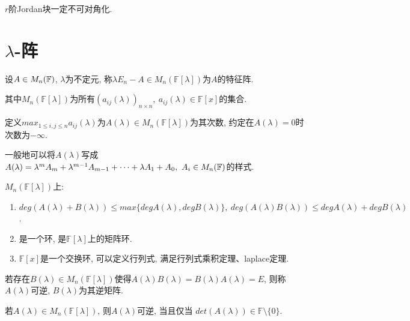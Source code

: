 \begin{example}
    $r$阶Jordan块一定不可对角化.
\end{example}

\section{ $\lambda$-阵 }

\begin{definition}[特征阵]
    设$A\in M_{n}(\mathbb{F})$, $\lambda$为不定元, 称$\lambda E_n-A\in M_n(\mathbb{F}[\lambda])$为$A$的特征阵.\par
    其中$M_n(\mathbb{F}[\lambda])$为所有$(a_{ij}(\lambda))_{n\times n},\ a_{ij}(\lambda)\in \mathbb{F}[x]$的集合.
\end{definition}


\begin{definition}
    定义$max_{1\le i,j \le n}a_{ij}(\lambda)$为$A(\lambda)\in M_n(\mathbb{F}[\lambda])$为其次数, 约定在$A(\lambda)=0$时次数为$-\infty$.\par
    一般地可以将$A(\lambda)$写成$A(\lambda)=\lambda{^m}A_m+\lambda{^{m-1}}A_{m-1}+\cdots+\lambda A_1+A_0,\ A_i\in M_{n}(\mathbb{F})$的样式.
\end{definition}

\begin{property}
    $M_n(\mathbb{F}[\lambda])$上:\par
    \begin{enumerate}[itemindent=1em]
        \item $deg(A(\lambda)+B(\lambda))\le max\{degA(\lambda), degB(\lambda)\},\ deg(A(\lambda)B(\lambda))\le degA(\lambda)+degB(\lambda)$.
        \item 是一个环, 是$\mathbb{F}[\lambda]$上的矩阵环.
        \item $\mathbb{F}[x]$是一个交换环, 可以定义行列式, 满足行列式乘积定理、laplace定理.
    \end{enumerate}
\end{property}

\begin{definition}
    若存在$B(\lambda)\in M_n(\mathbb{F}[\lambda])$使得$A(\lambda)B(\lambda)=B(\lambda)A(\lambda)=E$, 则称$A(\lambda)$可逆, $B(\lambda)$为其逆矩阵.
\end{definition}

\begin{theorem}
    若$A(\lambda)\in M_n(\mathbb{F}[\lambda])$, 则$A(\lambda)$可逆, 当且仅当
    $det(A(\lambda))\in \mathbb{F} \setminus \{0\}$.
\end{theorem}

